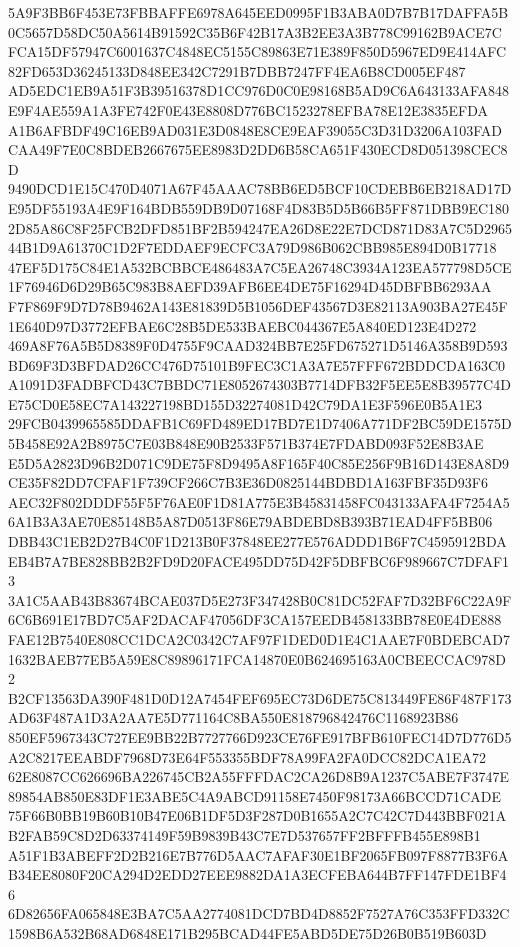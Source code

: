 \documentclass[UTF8,fontset=fandol,zihao=-4,a4paper]{ctexart}
\begin{document}
{{5A9F3BB6F453E73FBBAFFE6978A645EED0995F1B3ABA0D7B7B17DAFFA5B0C5657D58DC50A5614B91592C35B6F42B17A3B2EE3A3B778C99162B9ACE7C
FCA15DF57947C6001637C4848EC5155C89863E71E389F850D5967ED9E414AFC82FD653D36245133D848EE342C7291B7DBB7247FF4EA6B8CD005EF487
AD5EDC1EB9A51F3B39516378D1CC976D0C0E98168B5AD9C6A643133AFA848E9F4AE559A1A3FE742F0E43E8808D776BC1523278EFBA78E12E3835EFDA
A1B6AFBDF49C16EB9AD031E3D0848E8CE9EAF39055C3D31D3206A103FADCAA49F7E0C8BDEB2667675EE8983D2DD6B58CA651F430ECD8D051398CEC8D
9490DCD1E15C470D4071A67F45AAAC78BB6ED5BCF10CDEBB6EB218AD17DE95DF55193A4E9F164BDB559DB9D07168F4D83B5D5B66B5FF871DBB9EC180
2D85A86C8F25FCB2DFD851BF2B594247EA26D8E22E7DCD871D83A7C5D296544B1D9A61370C1D2F7EDDAEF9ECFC3A79D986B062CBB985E894D0B17718
47EF5D175C84E1A532BCBBCE486483A7C5EA26748C3934A123EA577798D5CE1F76946D6D29B65C983B8AEFD39AFB6EE4DE75F16294D45DBFBB6293AA
F7F869F9D7D78B9462A143E81839D5B1056DEF43567D3E82113A903BA27E45F1E640D97D3772EFBAE6C28B5DE533BAEBC044367E5A840ED123E4D272
469A8F76A5B5D8389F0D4755F9CAAD324BB7E25FD675271D5146A358B9D593BD69F3D3BFDAD26CC476D75101B9FEC3C1A3A7E57FFF672BDDCDA163C0
A1091D3FADBFCD43C7BBDC71E8052674303B7714DFB32F5EE5E8B39577C4DE75CD0E58EC7A143227198BD155D32274081D42C79DA1E3F596E0B5A1E3
29FCB0439965585DDAFB1C69FD489ED17BD7E1D7406A771DF2BC59DE1575D5B458E92A2B8975C7E03B848E90B2533F571B374E7FDABD093F52E8B3AE
E5D5A2823D96B2D071C9DE75F8D9495A8F165F40C85E256F9B16D143E8A8D9CE35F82DD7CFAF1F739CF266C7B3E36D0825144BDBD1A163FBF35D93F6
AEC32F802DDDF55F5F76AE0F1D81A775E3B45831458FC043133AFA4F7254A56A1B3A3AE70E85148B5A87D0513F86E79ABDEBD8B393B71EAD4FF5BB06
DBB43C1EB2D27B4C0F1D213B0F37848EE277E576ADDD1B6F7C4595912BDAEB4B7A7BE828BB2B2FD9D20FACE495DD75D42F5DBFBC6F989667C7DFAF13
3A1C5AAB43B83674BCAE037D5E273F347428B0C81DC52FAF7D32BF6C22A9F6C6B691E17BD7C5AF2DACAF47056DF3CA157EEDB458133BB78E0E4DE888
FAE12B7540E808CC1DCA2C0342C7AF97F1DED0D1E4C1AAE7F0BDEBCAD71632BAEB77EB5A59E8C89896171FCA14870E0B624695163A0CBEECCAC978D2
B2CF13563DA390F481D0D12A7454FEF695EC73D6DE75C813449FE86F487F173AD63F487A1D3A2AA7E5D771164C8BA550E818796842476C1168923B86
850EF5967343C727EE9BB22B7727766D923CE76FE917BFB610FEC14D7D776D5A2C8217EEABDF7968D73E64F553355BDF78A99FA2FA0DCC82DCA1EA72
62E8087CC626696BA226745CB2A55FFFDAC2CA26D8B9A1237C5ABE7F3747E89854AB850E83DF1E3ABE5C4A9ABCD91158E7450F98173A66BCCD71CADE
75F66B0BB19B60B10B47E06B1DF5D3F287D0B1655A2C7C42C7D443BBF021AB2FAB59C8D2D63374149F59B9839B43C7E7D537657FF2BFFFB455E898B1
A51F1B3ABEFF2D2B216E7B776D5AAC7AFAF30E1BF2065FB097F8877B3F6AB34EE8080F20CA294D2EDD27EEE9882DA1A3ECFEBA644B7FF147FDE1BF46
6D82656FA065848E3BA7C5AA2774081DCD7BD4D8852F7527A76C353FFD332C1598B6A532B68AD6848E171B295BCAD44FE5ABD5DE75D26B0B519B603D
}}
\end{document}
